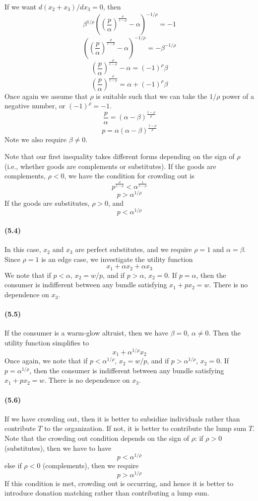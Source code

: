 \documentclass[10pt,letter]{article}
\begin{document}
If we want $d(x_2 + x_3)/dx_3 = 0$, then
\[ \beta^{1/\rho}\left(  \left(\frac{p}{\alpha}\right)^{\frac{\rho}{1-\rho}}  - \alpha \right)^{-1/\rho} = -1 \]
\[ \left( \left(\frac{p}{\alpha}\right)^{\frac{\rho}{1-\rho}} - \alpha \right)^{-1/\rho} = - \beta^{-1/\rho} \]
\[ \left(\frac{p}{\alpha}\right)^{\frac{\rho}{1-\rho}} - \alpha  = (-1)^{\rho}\beta\]
\[ \left(\frac{p}{\alpha}\right)^{\frac{\rho}{1-\rho}}  = \alpha + (-1)^{\rho} \beta \]
Once again we assume that $\rho$ is suitable such that we can take the $1/\rho$ power of a negative number, or $(-1)^\rho = -1$.
\[ \frac{p}{\alpha}  = (\alpha - \beta)^{\frac{1-\rho}{\rho}}\]
\[ p  = \alpha(\alpha - \beta)^{\frac{1-\rho}{\rho}}\]
Note we also require $\beta \neq 0$.

Note that our first inequality takes different forms depending on the sign of $\rho$ (i.e., whether goods are complements or substitutes). If the goods are complements, $\rho < 0$, we have the condition for crowding out is
\[ p^{\frac{\rho}{1-\rho}} <  \alpha^{\frac{1}{1-\rho}} \]
\[ p > \alpha^{1/\rho} \]
If the goods are substitutes, $\rho > 0$, and
\[ p < \alpha^{1/\rho} \]
\paragraph{(5.4)}
In this case, $x_2$ and $x_3$ are perfect substitutes, and we require $\rho = 1$ and $\alpha = \beta$. Since $\rho=1$ is an edge case, we investigate the utility function \[ x_1 + \alpha x_2 + \alpha x_3 \]
We note that if $p < \alpha$, $x_2 = w/p$, and if $p > \alpha$, $x_2 = 0$. If $p = \alpha$, then the consumer is indifferent between any bundle satisfying $x_1 + px_2 = w$. There is no dependence on $x_3$.
\paragraph{(5.5)}
If the consumer is a warm-glow altruist, then we have $\beta = 0$, $\alpha \neq 0$. Then the utility function simplifies to
\[ x_1 + \alpha^{1/\rho} x_2 \]
Once again, we note that if $p < \alpha^{1/\rho}$, $x_2 = w/p$, and if $p > \alpha^{1/\rho}$, $x_2 = 0$. If $p = \alpha^{1/\rho}$, then the consumer is indifferent between any bundle satisfying $x_1 + px_2 = w$. There is no dependence on $x_3$.
\paragraph{(5.6)}
If we have crowding out, then it is better to subsidize individuals rather than contribute $T$ to the organization. If not, it is better to contribute the lump sum $T$. Note that the crowding out condition depends on the sign of $\rho$: if $\rho > 0$ (substitutes), then we have to have
\[ p < \alpha^{1/\rho} \]
else if $\rho < 0$ (complements), then we require
\[ p > \alpha^{1/\rho} \]
If this condition is met, crowding out is occurring, and hence it is better to introduce donation matching rather than contributing a lump sum.
\end{document}

